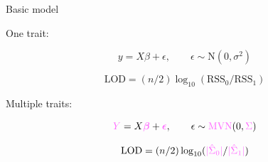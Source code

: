 \documentclass[12pt]{article}
\newcommand{\headsize}{\fontsize{35}{35} \selectfont}
\newcommand{\smallsize}{\fontsize{25}{30} \selectfont}
\begin{document}
\newpage

\headsize \color{myyellow}
\hfill \begin{minipage}{5.75in}
\centering
Basic model
\end{minipage}

\vspace{25mm}

\color{white} \smallsize

One trait:

\vspace{-18pt}

{\color{myblue} $$ y = X \beta + \epsilon, \qquad \epsilon \sim \text{N}(0, \sigma^2) $$}

\vspace{-8pt}

{\color{myblue} $$ \text{LOD} = (n/2) \log_{10} ( \text{RSS}_0 /
  \text{RSS}_1 ) $$ }

\vspace{15mm}

Multiple traits:

\vspace{-18pt}

{\color{myblue} $$ {\color{mypink} Y} = X {\color{mypink}
    \boldsymbol{\beta}} + {\color{mypink} \boldsymbol{\epsilon}},
  \qquad \epsilon \sim \text{\color{mypink} MVN}(0, {\color{mypink} \Sigma}) $$ }

\vspace{-8pt}

{\color{myblue} $$ \text{LOD} = (n/2) \log_{10} ( {\color{mypink} |\hat{\Sigma}_0|} /
  {\color{mypink} |\hat{\Sigma}_1|}) $$ }
\end{document}
